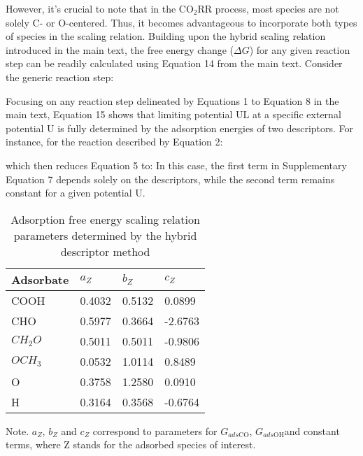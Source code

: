 However, it's crucial to note that in the CO$_2$RR process, most species are not solely C- or O-centered. Thus, it becomes advantageous to incorporate both types of species in the scaling relation. Building upon the hybrid scaling relation introduced in the main text, the free energy change ($\Delta\mathit{G}$) for any given reaction step can be readily calculated using Equation 14 from the main text. Consider the generic reaction step:

Focusing on any reaction step delineated by Equations 1 to Equation 8 in the main text, Equation 15 shows that limiting potential UL at a specific external potential U is fully determined by the adsorption energies of two descriptors. For instance, for the reaction described by Equation 2:


which then reduces Equation 5 to:
In this case, the first term in Supplementary Equation 7 depends solely on the descriptors, while the second term remains constant for a given potential U.


\begin{table}[h]
  \centering
  \begin{tabular}{*{4}{l}}
    \hline
    Adsorbate & $a_Z$  & $b_Z$  & $c_Z$   \\
    \hline
    COOH      & 0.4032 & 0.5132 & 0.0899  \\
    CHO       & 0.5977 & 0.3664 & -2.6763 \\
    $CH_2O$   & 0.5011 & 0.5011 & -0.9806 \\
    $OCH_3$   & 0.0532 & 1.0114 & 0.8489  \\
    O         & 0.3758 & 1.2580 & 0.0910  \\
    H         & 0.3164 & 0.3568 & -0.6764 \\
    \hline
  \end{tabular}
  \caption{Adsorption free energy scaling relation parameters determined by the hybrid descriptor method}
  \label{si_table13}
\end{table}
Note. $a_{\mathit{Z}}$, $b_{\mathit{Z}}$ and $c_{\mathit{Z}}$ correspond to parameters for $G_{\mathit{ads}\mathrm{CO}}$, $G_{\mathit{ads}\mathrm{OH}}$and constant terms, where Z stands for the adsorbed species of interest.


